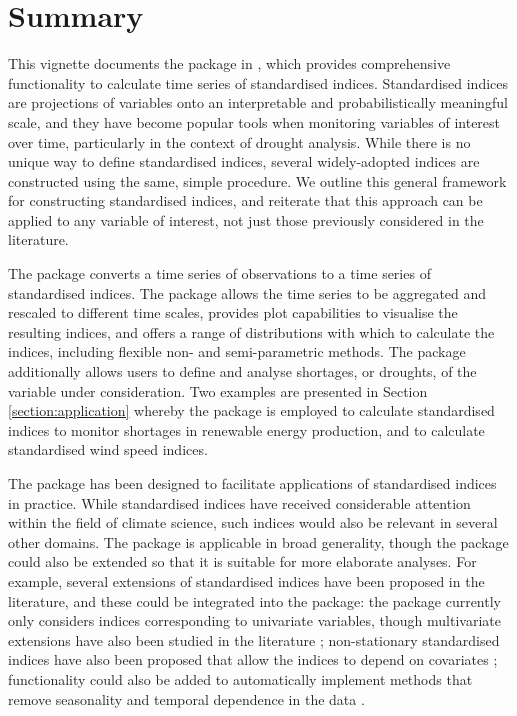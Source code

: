\documentclass[article,shortnames,nojss]{jss}\usepackage[]{graphicx}\usepackage[]{xcolor}
\begin{document}
\section{Summary}\label{section:conclusion}

This vignette documents the  package in , which provides comprehensive functionality to calculate time series of standardised indices. Standardised indices are projections of variables onto an interpretable and probabilistically meaningful scale, and they have become popular tools when monitoring variables of interest over time, particularly in the context of drought analysis. While there is no unique way to define standardised indices, several widely-adopted indices are constructed using the same, simple procedure. We outline this general framework for constructing standardised indices, and reiterate that this approach can be applied to any variable of interest, not just those previously considered in the literature.

The  package converts a time series of observations to a time series of standardised indices. The package allows the time series to be aggregated and rescaled to different time scales, provides plot capabilities to visualise the resulting indices, and offers a range of distributions with which to calculate the indices, including flexible non- and semi-parametric methods. The package additionally allows users to define and analyse shortages, or droughts, of the variable under consideration. Two examples are presented in Section \ref{section:application} whereby the package is employed to calculate standardised indices to monitor shortages in renewable energy production, and to calculate standardised wind speed indices.

The package has been designed to facilitate applications of standardised indices in practice. While standardised indices have received considerable attention within the field of climate science, such indices would also be relevant in several other domains. The  package is applicable in broad generality, though the package could also be extended so that it is suitable for more elaborate analyses. For example, several extensions of standardised indices have been proposed in the literature, and these could be integrated into the package: the package currently only considers indices corresponding to univariate variables, though multivariate extensions have also been studied in the literature \citep[e.g.][]{ErhardtCzado2018,HaoEtAl2019}; non-stationary standardised indices have also been proposed that allow the indices to depend on covariates \citep{RussoEtAl2013,LiEtAl2015}; functionality could also be added to automatically implement methods that remove seasonality and temporal dependence in the data \citep{ErhardtCzado2018}. %
\end{document}

